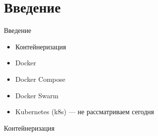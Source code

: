 \section{Введение}\label{sec:introduction}

\begin{frame}{Введение}
    \begin{itemize}
        \item Контейнеризация
        \item Docker
        \item Docker Compose
        \item Docker Swarm
        \item Kubernetes (k8s) --- не рассматриваем сегодня
    \end{itemize}
\end{frame}

\begin{frame}{Контейнеризация}

\end{frame}
